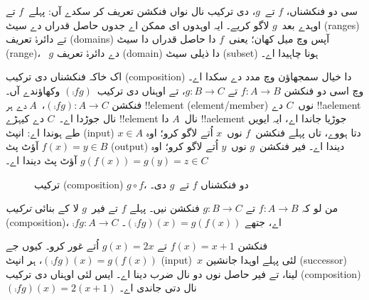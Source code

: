 \documentclass[../../../include/open-logic-section]{subfiles}
\begin{document}

\begin{explain}
سی دو فنکشناں، $f$ تے~$g$، دی ترکیب نال نواں
فنکشن تعریف کر سکدے آں: پہلے~$f$ تے اوہدے بعد~$g$ لاگو کریے۔ ایہ
اوہدوں ای ممکن اے جدوں حاصل قدراں دے سیٹ (ranges) تے دائرۂ تعریف
(domains) آپس وچ میل کھان؛ یعنی~$f$ دا حاصل قدراں دا سیٹ (range)،
~$g$ دے دائرۂ تعریف (domain) دا ذیلی سیٹ (subset) ہونا چاہیدا اے۔

اک خاکہ فنکشناں دی ترکیب (composition) دا خیال سمجھاؤن وچ مدد دے
سکدا اے۔  وچ اسی دو فنکشن $f \colon A \to B$
تے $g \colon B \to C$، تے اوہناں دی ترکیب~$(\comp{f}{g})$ وکھاؤندے
آں۔ فنکشن $(\comp{f}{g}) \colon A \to C$،~$A$ دے ہر !!{element}
(element/member) نوں~$C$ دے !!a{element} نال جوڑدا اے۔~$C$ دے کیہڑے
!!{element} نال~$A$ دا !!a{element} جوڑیا جاندا اے، ایہ ایویں
طے ہوندا اے: انپٹ (input) $x \in A$ دتا ہووے، تاں پہلے فنکشن~$f$
نوں~$x$ اُتے لاگو کرو؛ اوہ $f(x) = y \in B$ آؤٹ پٹ (output) دیندا
اے۔ فیر فنکشن~$g$ نوں~$y$ اُتے لاگو کرو؛ اوہ
$g(f(x)) = g(y) = z \in C$ آؤٹ پٹ دیندا اے۔
\begin{figure}
  \caption{ترکیب (composition) $g \circ f$، دو فنکشناں $f$ تے~$g$ دی۔}
\end{figure}
\end{explain}

\begin{defn}
من لو کہ $f\colon A \to B$ تے $g\colon B \to C$ فنکشن نیں۔ پہلے
$f$ تے فیر~$g$ لا کے بنائی \emph{ترکیب} (composition)،
$\comp{f}{g} \colon A \to C$ اے، جتھے
$(\comp{f}{g})(x) = g(f(x))$۔
\end{defn}

\begin{ex}
فنکشن $f(x) = x + 1$ تے $g(x) = 2x$ اُتے غور کرو۔ کیوں جے
$(\comp{f}{g})(x) = g(f(x))$، ہر انپٹ (input)~$x$ لئی پہلے اوہدا
جانشین (successor) لینا، تے فیر حاصل نوں دو نال ضرب دینا اے۔ ایس لئی
اوہناں دی ترکیب (composition) $(\comp{f}{g})(x) = 2(x+1)$ نال دتی
جاندی اے۔
\end{ex}
\end{document}
